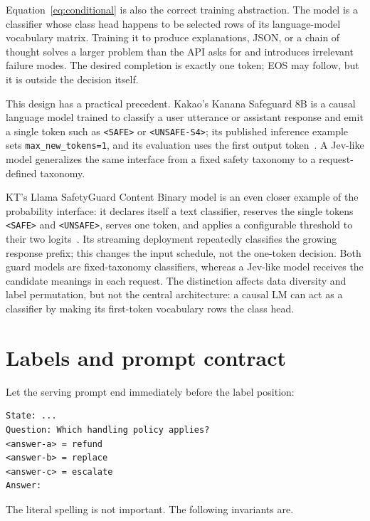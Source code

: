 \documentclass[11pt]{article}
\begin{document}
Equation~\ref{eq:conditional} is also the correct training abstraction.
The model is a classifier whose class head happens to be selected rows of
its language-model vocabulary matrix.  Training it to produce explanations,
JSON, or a chain of thought solves a larger problem than the API asks for
and introduces irrelevant failure modes.  The desired completion is exactly
one token; EOS may follow, but it is outside the decision itself.

This design has a practical precedent.  Kakao's Kanana Safeguard 8B is a
causal language model trained to classify a user utterance or assistant
response and emit a single token such as \texttt{<SAFE>} or
\texttt{<UNSAFE-S4>}; its published inference example sets
\texttt{max\_new\_tokens=1}, and its evaluation uses the first output
token~\cite{kanana}.  A Jev-like model generalizes the same interface from a
fixed safety taxonomy to a request-defined taxonomy.

KT's Llama SafetyGuard Content Binary model is an even closer example of the
probability interface: it declares itself a text classifier, reserves the
single tokens \texttt{<SAFE>} and \texttt{<UNSAFE>}, serves one token, and
applies a configurable threshold to their two logits~\cite{contentbinary}.
Its streaming deployment repeatedly classifies the growing response prefix;
this changes the input schedule, not the one-token decision.  Both guard
models are fixed-taxonomy classifiers, whereas a Jev-like model receives the
candidate meanings in each request.  The distinction affects data diversity
and label permutation, but not the central architecture: a causal LM can act
as a classifier by making its first-token vocabulary rows the class head.

\section{Labels and prompt contract}

Let the serving prompt end immediately before the label position:
\begin{verbatim}
State: ...
Question: Which handling policy applies?
<answer-a> = refund
<answer-b> = replace
<answer-c> = escalate
Answer:
\end{verbatim}
The literal spelling is not important.  The following invariants are.
\end{document}
